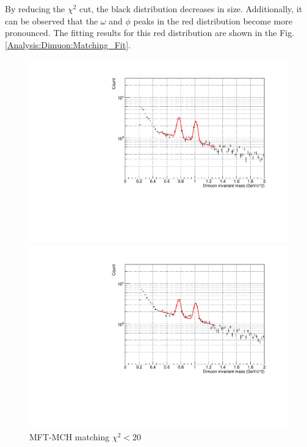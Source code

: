             By reducing the \(\chi^2\) cut, the black distribution decreases in size. Additionally, it can be observed that the \(\omega\) and \(\phi\) peaks in the red distribution become more pronounced. The fitting results for this red distribution are shown in the Fig.\ref{Analysis:Dimuon:Matching_Fit}.
            \begin{figure}[H]
                \centering
                \begin{minipage}{0.45\textwidth}
                    \centering
                    \includegraphics[width=\textwidth]{fig/3_4_4_Fit_chi2_20.pdf}
                    \caption*{MFT-MCH matching $\chi^2 < 20$}
                \end{minipage}
                \hfill
                \begin{minipage}{0.45\textwidth}
                    \centering
                    \includegraphics[width=\textwidth]{fig/3_4_4_Fit_chi2_40.pdf}

\end{minipage}
\end{figure}
